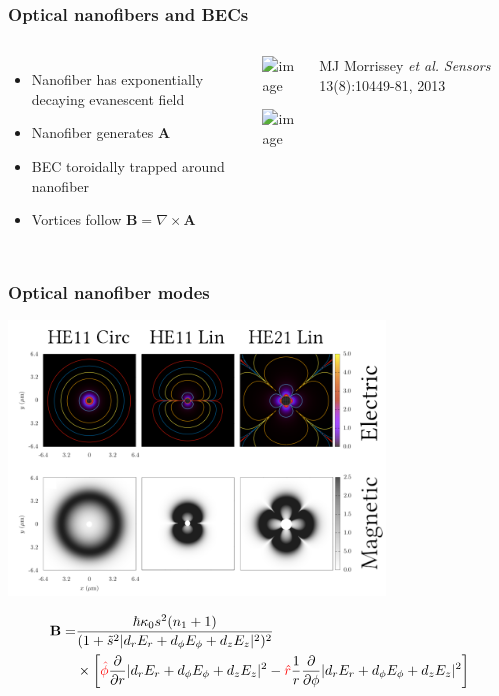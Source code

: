 \documentclass{beamer}
\begin{document}
\begin{frame}
\frametitle{Optical nanofibers and BECs}

\begin{columns}

\begin{itemize}
\item Nanofiber has exponentially decaying evanescent field
\item Nanofiber generates $\mathbf{A}$
\item BEC toroidally trapped around nanofiber
\item Vortices follow $\mathbf{B} = \nabla \times \mathbf{A}$
\end{itemize}

\begin{center}
\includegraphics<1>[width=\textwidth]{nanofiber_1}

\includegraphics<2>[width=\textwidth]{nanofiber_2}
\end{center}

\tiny MJ Morrissey \textit{et al.} \textit{Sensors} 13(8):10449-81, 2013
\end{columns}



\end{frame}

\begin{frame}
\frametitle{Optical nanofiber modes}
\center \includegraphics[width=0.75\textwidth]{all_fields.png}

\small{\begin{align}
\mathbf{B} =& \frac{\hbar \kappa_0 s^2(n_1 + 1)}{(1+\tilde s^2|d_rE_r + d_{\phi}E_{\phi} + d_zE_z|^2)^2} \nonumber\\
&\times \bigg[ {\color{red}{\hat\phi}}  \frac{\partial}{\partial r} |d_rE_r + d_{\phi}E_{\phi} + d_zE_z|^2 - {\color{red}{\hat r}} \frac{1}{r} \frac{\partial}{\partial \phi} |d_rE_r + d_{\phi}E_{\phi} + d_zE_z|^2 \bigg ] \nonumber
\end{align}}
\end{frame}
\end{document}
